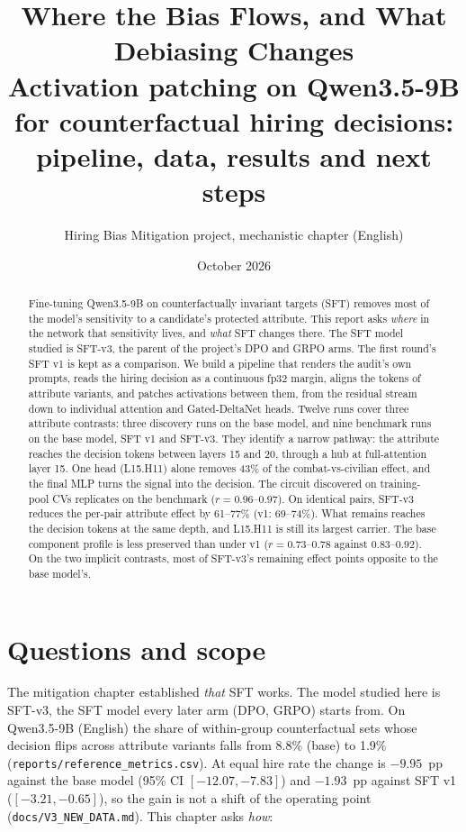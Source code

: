 \documentclass[11pt,a4paper]{article}
\title{\textbf{Where the Bias Flows, and What Debiasing Changes}\\[4pt]
\large Activation patching on Qwen3.5-9B for counterfactual hiring decisions:\\
pipeline, data, results and next steps}
\author{Hiring Bias Mitigation project, mechanistic chapter (English)}
\date{October 2026}
\newcommand{\head}[2]{\textsf{L#1.H#2}}
\begin{document}
\maketitle

\begin{abstract}
\noindent
Fine-tuning Qwen3.5-9B on counterfactually invariant targets (SFT) removes most of the model's
sensitivity to a candidate's protected attribute. This report asks \emph{where} in the network that
sensitivity lives, and \emph{what} SFT changes there. The SFT model studied is SFT-v3, the parent
of the project's DPO and GRPO arms. The first round's SFT v1 is kept as a comparison.
We build a pipeline that renders the audit's own prompts, reads the hiring decision as a
continuous fp32 margin, aligns the tokens of attribute variants, and patches activations between
them, from the residual stream down to individual attention and Gated-DeltaNet heads.
Twelve runs cover three attribute contrasts: three discovery runs on the base model, and nine
benchmark runs on the base model, SFT v1 and SFT-v3. They identify a
narrow pathway: the attribute reaches the decision tokens between layers 15 and 20, through a hub
at full-attention layer 15. One head (\head{15}{11}) alone removes 43\% of the combat-vs-civilian
effect, and the final MLP turns the signal into the decision.
The circuit discovered on training-pool CVs replicates on the benchmark ($r=0.96$--$0.97$). On
identical pairs, SFT-v3 reduces the per-pair attribute effect by 61--77\% (v1: 69--74\%). What
remains reaches the decision tokens at the same depth, and \head{15}{11} is still its largest
carrier. The base component profile is less preserved than under v1 ($r=0.73$--$0.78$ against
$0.83$--$0.92$). On the two implicit contrasts, most of SFT-v3's remaining effect points opposite
to the base model's.
\end{abstract}

\tableofcontents
\newpage

\section{Questions and scope}

The mitigation chapter established \emph{that} SFT works. The model studied here is SFT-v3, the
SFT model every later arm (DPO, GRPO) starts from. On Qwen3.5-9B (English) the share of
within-group counterfactual sets whose decision flips across attribute variants falls from 8.8\%
(base) to 1.9\% (\texttt{reports/reference\_metrics.csv}). At equal hire rate the change is
$-9.95$~pp against the base model (95\% CI $[-12.07, -7.83]$) and $-1.93$~pp against SFT v1
($[-3.21, -0.65]$), so the gain is not a shift of the operating point
(\texttt{docs/V3\_NEW\_DATA.md}). This chapter asks \emph{how}:
\end{document}
